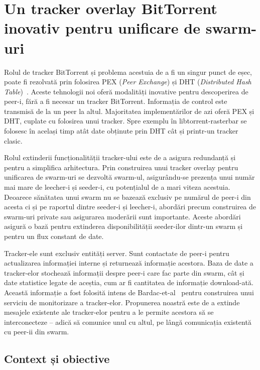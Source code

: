 
\chapter{Un tracker overlay BitTorrent inovativ pentru unificare de swarm-uri}
\label{chapter:unified-tracker}

Rolul de tracker BitTorrent și problema acestuia de a fi un singur punct de eșec, poate fi rezolvată prin folosirea PEX (\textit{Peer Exchange}) și DHT (\textit{Distributed Hash Table})~\cite{dht-paper}. Aceste tehnologii noi oferă modalități inovative pentru descoperirea de peer-i, fără a fi necesar un tracker BitTorrent. Informația de control este transmisă de la un peer la altul. Majoritatea implementărilor de azi oferă PEX și DHT, cuplate cu folosirea unui tracker. Spre exemplu în libtorrent-rasterbar se folosesc în același timp atât date obținute prin DHT cât și printr-un tracker clasic.

Rolul extinderii funcționalității tracker-ului este de a asigura redundanță și pentru a simplifica arhitectura. Prin construirea unui tracker overlay pentru unificarea de swarm-uri se dezvoltă swarm-ul, asigurându-se prezența unui număr mai mare de leecher-i și seeder-i, cu potențialul de a mari viteza acestuia. Deoarece sănătatea unui swarm nu se bazează exclusiv pe numărul de peer-i din acesta ci și pe raportul dintre seeder-i și leecher-i, abordări precum construirea de swarm-uri private sau asigurarea moderării sunt importante. Aceste abordări asigură o bază pentru extinderea disponibilității seeder-ilor dintr-un swarm și pentru un flux constant de date.

Tracker-ele sunt exclusiv entități server. Sunt contactate de peer-i pentru actualizarea informației interne și returnează informație acestora. Baza de date a tracker-elor stochează informații despre peer-i care fac parte din swarm, cât și date statistice legate de aceștia, cum ar fi cantitatea de informație download-ată. Această informație a fost folosită intens de Bardac-et-al~\cite{tracker-mon} pentru construirea unui serviciu de monitorizare a tracker-elor. Propunerea noastră este de a extinde mesajele existente ale tracker-elor pentru a le permite acestora să se interconecteze -- adică să comunice unul cu altul, pe lângă comunicația existentă cu peer-ii din swarm.

\section{Context și obiective}
\label{sec:unified-tracker:context}

